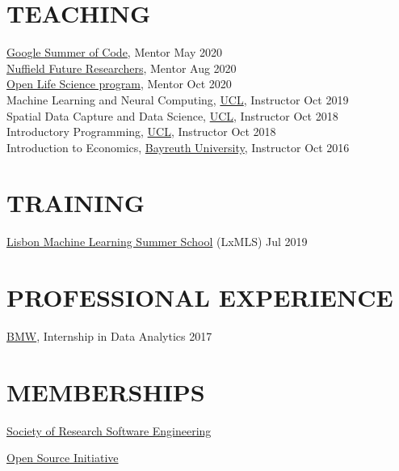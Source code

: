 \documentclass{cv}
\begin{document}
\section{TEACHING}

\href{https://summerofcode.withgoogle.com/archive/2020/projects/6262209727954944/}{Google Summer of Code}, Mentor \hfill May 2020 \\

\href{https://www.nuffieldfoundation.org/students-teachers/nuffield-future-researchers}{Nuffield Future Researchers}, Mentor \hfill Aug 2020 \\

\href{https://openlifesci.org}{Open Life Science program}, Mentor \hfill Oct 2020 \\
Machine Learning and Neural Computing, \href{https://www.ucl.ac.uk/}{UCL}, Instructor \hfill Oct 2019 \\

Spatial Data Capture and Data Science, \href{https://www.ucl.ac.uk/}{UCL}, Instructor \hfill Oct 2018 \\

Introductory Programming, \href{https://www.ucl.ac.uk/}{UCL}, Instructor \hfill Oct 2018 \\

Introduction to Economics, \href{https://www.uni-bayreuth.de/en/}{Bayreuth University}, Instructor \hfill Oct 2016 \\

\section{TRAINING}

\href{http://lxmls.it.pt/}{Lisbon Machine Learning Summer School} (LxMLS) \hfill Jul 2019 \\


\section{PROFESSIONAL EXPERIENCE}

\href{https://www.bmw.com/en/index.html}{BMW}, Internship in Data Analytics  \hfill 2017 



\section{MEMBERSHIPS}

\href{https://society-rse.org/}{Society of Research Software Engineering}
\vspace{5pt}

\href{http://opensource.org}{Open Source Initiative}
\end{document}
